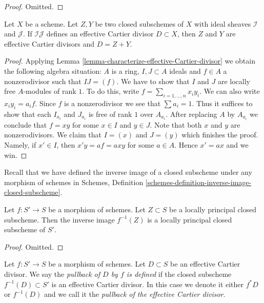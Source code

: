 \begin{proof}
Omitted.
\end{proof}

\begin{lemma}
\label{lemma-sum-closed-subschemes-effective-Cartier}
Let $X$ be a scheme. Let $Z, Y$ be two closed subschemes of $X$
with ideal sheaves $\mathcal{I}$ and $\mathcal{J}$. If $\mathcal{I}\mathcal{J}$
defines an effective Cartier divisor $D \subset X$, then $Z$ and $Y$
are effective Cartier divisors and $D = Z + Y$.
\end{lemma}

\begin{proof}
Applying Lemma \ref{lemma-characterize-effective-Cartier-divisor} we obtain
the following algebra situation: $A$ is a ring, $I, J \subset A$
ideals and $f \in A$ a nonzerodivisor such that $IJ = (f)$. We have
to show that $I$ and $J$ are locally free $A$-modules of rank $1$.
To do this, write $f = \sum_{i = 1, \ldots, n} x_i y_i$. We can
also write $x_iy_i = a_i f$. Since $f$ is a nonzerodivisor we see that
$\sum a_i = 1$. Thus it suffices to show that each $I_{a_i}$ and
$J_{a_i}$ is free of rank $1$ over $A_{a_i}$. After replacing $A$ by
$A_{a_i}$ we conclude that $f = xy$ for some $x \in I$ and $y \in J$.
Note that both $x$ and $y$ are nonzerodivisors. We claim that
$I = (x)$ and $J = (y)$ which finishes the proof. Namely, if $x' \in I$,
then $x'y = af = axy$ for some $a \in A$. Hence $x' = ax$ and we win.
\end{proof}

\noindent
Recall that we have defined the inverse image of a closed subscheme
under any morphism of schemes in
Schemes, Definition \ref{schemes-definition-inverse-image-closed-subscheme}.

\begin{lemma}
\label{lemma-pullback-locally-principal}
Let $f : S' \to S$ be a morphism of schemes. Let $Z \subset S$
be a locally principal closed subscheme. Then the inverse image
$f^{-1}(Z)$ is a locally principal closed subscheme of $S'$.
\end{lemma}

\begin{proof}
Omitted.
\end{proof}

\begin{definition}
\label{definition-pullback-effective-Cartier-divisor}
Let $f : S' \to S$ be a morphism of schemes. Let $D \subset S$
be an effective Cartier divisor. We say the {\it pullback of
$D$ by $f$ is defined} if the closed subscheme $f^{-1}(D) \subset S'$
is an effective Cartier divisor. In this case we denote it either
$f^*D$ or $f^{-1}(D)$ and we call it the
{\it pullback of the effective Cartier divisor}.
\end{definition}

